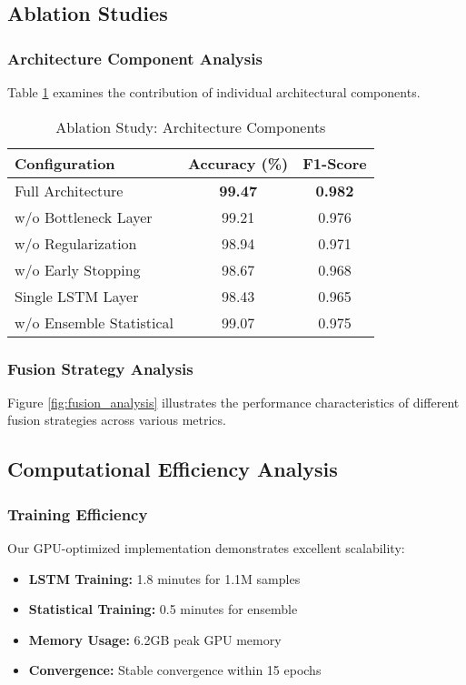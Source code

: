 \documentclass[conference]{IEEEtran}
\begin{document}
\subsection{Ablation Studies}

\subsubsection{Architecture Component Analysis}
Table \ref{tab:ablation_architecture} examines the contribution of individual architectural components.

\begin{table}[!ht]
\centering
\caption{Ablation Study: Architecture Components}
\label{tab:ablation_architecture}
\begin{tabular}{@{}lcc@{}}
\toprule
\textbf{Configuration} & \textbf{Accuracy (\%)} & \textbf{F1-Score} \\
\midrule
Full Architecture & \textbf{99.47} & \textbf{0.982} \\
w/o Bottleneck Layer & 99.21 & 0.976 \\
w/o Regularization & 98.94 & 0.971 \\
w/o Early Stopping & 98.67 & 0.968 \\
Single LSTM Layer & 98.43 & 0.965 \\
w/o Ensemble Statistical & 99.07 & 0.975 \\
\bottomrule
\end{tabular}
\end{table}

\subsubsection{Fusion Strategy Analysis}
Figure \ref{fig:fusion_analysis} illustrates the performance characteristics of different fusion strategies across various metrics.

\subsection{Computational Efficiency Analysis}

\subsubsection{Training Efficiency}
Our GPU-optimized implementation demonstrates excellent scalability:
\begin{itemize}
\item \textbf{LSTM Training:} 1.8 minutes for 1.1M samples
\item \textbf{Statistical Training:} 0.5 minutes for ensemble
\item \textbf{Memory Usage:} 6.2GB peak GPU memory
\item \textbf{Convergence:} Stable convergence within 15 epochs
\end{itemize}
\end{document}
